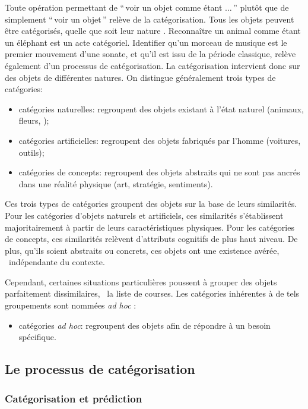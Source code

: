 {Toute opération permettant de ``\,voir un objet comme étant $\ldots$\,'' plutôt que de simplement ``\,voir un objet\,'' relève de la catégorisation. Tous les objets peuvent être catégorisés, quelle que soit leur nature \citep{goldstone2003concepts}. Reconnaître un animal comme étant un éléphant est un acte catégoriel. Identifier qu'un morceau de musique est le premier mouvement d'une sonate, et qu'il est issu de la période classique, relève également d'un processus de catégorisation. La catégorisation intervient donc sur des objets de différentes natures. On distingue généralement trois types de catégories:

\begin{itemize}
\item catégories naturelles: regroupent des objets existant à l'état naturel (animaux, fleurs, \etc);
\item catégories artificielles: regroupent des objets fabriqués par l'homme (voitures, outils);
\item catégories de concepts:  regroupent des objets abstraits qui ne sont pas ancrés dans une réalité physique (art, stratégie, sentiments).
\end{itemize}

Ces trois types de catégories groupent des objets sur la base de leurs similarités. Pour les catégories d'objets naturels et artificiels, ces similarités s'établissent majoritairement à partir de leurs caractéristiques physiques. Pour les catégories de concepts, ces similarités relèvent d'attributs cognitifs de plus haut niveau. De plus, qu'ils soient abstraits ou concrets, ces objets ont une existence avérée, \ie~indépendante du contexte.

Cependant, certaines situations particulières poussent à grouper des objets parfaitement dissimilaires, \eg~la liste de courses. Les catégories inhérentes à de tels groupements sont nommées \emph{ad hoc} \citep{barsalou1983ad}:

\begin{itemize}
 \item catégories \emph{ad hoc}: regroupent des objets afin de répondre à un besoin spécifique.
\end{itemize}

\subsection{Le processus de catégorisation}

\subsubsection{Catégorisation et prédiction}
\label{sec:ch3_categoPred}

}
